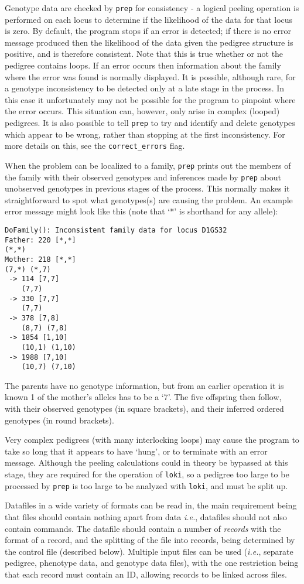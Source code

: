 \documentclass[10pt,a4paper]{article}
\newcommand{\IE}{\textit{i.e.},\xspace}
\newcommand{\Prep}{\texttt{prep}\xspace}
\newcommand{\Loki}{\texttt{loki}\xspace}
\begin{document}
Genotype data are checked by \Prep for consistency - a logical peeling
operation is performed on each locus to determine if the likelihood of the
data for that locus is zero.  By default, the program stops if an error is
detected; if there is no error message produced then the likelihood of the
data given the pedigree structure is positive, and is therefore consistent.
Note that this is true whether or not the pedigree contains loops.  If an
error occurs then information about the family where the error was found is
normally displayed.  It is possible, although rare, for a genotype
inconsistency to be detected only at a late stage in the process.  In this
case it unfortunately may not be possible for the program to pinpoint where
the error occurs.  This situation can, however, only arise in complex
(looped) pedigrees.  It is also possible to tell \Prep to try and identify
and delete genotypes which appear to be wrong, rather than stopping at the
first inconsistency. For more details on this, see the \verb+correct_errors+
flag.

When the problem can be localized to a family, \Prep prints out the members
of the family with their observed genotypes and inferences made by \Prep
about unobserved genotypes in previous stages of the process.  This normally
makes it straightforward to spot what genotypes(s) are causing the problem.
An example error message might look like this (note that `*' is shorthand
for any allele):
\begin{verbatim}
DoFamily(): Inconsistent family data for locus D1GS32
Father: 220 [*,*]
(*,*)
Mother: 218 [*,*]
(7,*) (*,7)
 -> 114 [7,7]
    (7,7) 
 -> 330 [7,7]
    (7,7)
 -> 378 [7,8]
    (8,7) (7,8)
 -> 1854 [1,10]
    (10,1) (1,10)
 -> 1988 [7,10]
    (10,7) (7,10)
\end{verbatim}
The parents have no genotype information, but from an earlier operation it
is known 1 of the mother's alleles has to be a `7'.  The five offspring then
follow, with their observed genotypes (in square brackets), and their
inferred ordered genotypes (in round brackets).

Very complex pedigrees (with many interlocking loops) may cause the program
to take so long that it appears to have `hung', or to terminate with an
error message.  Although the peeling calculations could in theory be
bypassed at this stage, they are required for the operation of \Loki, so a
pedigree too large to be processed by \Prep is too large to be analyzed with
\Loki, and must be split up.

Datafiles in a wide variety of formats can be read in, the main requirement
being that files should contain nothing apart from data \IE datafiles should
not also contain commands.  The datafile should contain a number of
\emph{records} with the format of a record, and the splitting of the file
into records, being determined by the control file (described below).
Multiple input files can be used (\IE separate pedigree, phenotype data, and
genotype data files), with the one restriction being that each record must
contain an ID, allowing records to be linked across files.
\end{document}
